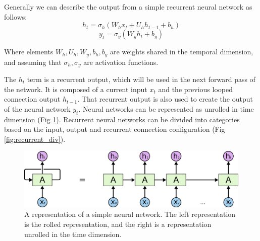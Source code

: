Generally we can describe the output from a simple recurrent neural network as follows:
\begin{equation}
h_t = \sigma_h(W_{h} x_t + U_{h} h_{t-1} + b_h)
\end{equation}
\begin{equation}
y_t = \sigma_y(W_{y} h_t + b_y)
\end{equation}

Where elements $W_{h}, U_{h}, W_{y}, b_{h}, b_{y}$ are weights shared in the temporal dimension, and assuming that $\sigma_{h},\sigma_{y}$ are activation functions.

The $h_{t}$ term is a recurrent output, which will be used in the next forward pass of the network.
It is composed of a current input $x_{t}$ and the previous looped connection output $h_{t-1}$.
That recurrent output is also used to create the output of the neural network $y_{t}$.
Neural networks can be represented as unrolled in time dimension (Fig \ref{fig:unroll_rec}).
Recurrent neural networks can be divided into categories based on the input, output and recurrent connection configuration (Fig \ref{fig:recurrent_div}).

\begin{figure}
  \centering
  \includegraphics[width=0.9\linewidth]{figures/chapter3/RNN-unrolled.png}
  \caption{A representation of a simple neural network.
   The left representation is the rolled representation, and the right is a representation unrolled in the time dimension.}
  \label{fig:unroll_rec}
\end{figure}

